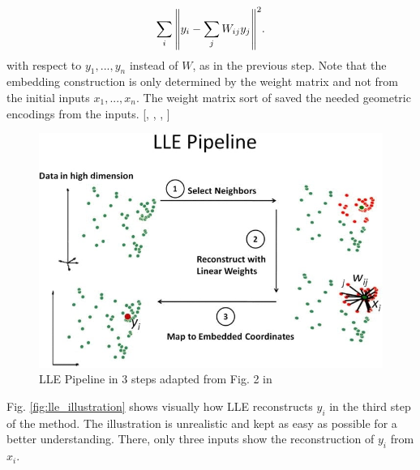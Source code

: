 \begin{equation}
    \sum_i \norm{y_i - \sum_{j} W_{ij}y_j}^2.
\end{equation}
with respect to $y_1,...,y_n$ instead of $W$, as in the previous step. Note that the embedding construction is only determined by the weight matrix and not from the initial inputs $x_1,...,x_n$. The weight matrix sort of saved the needed geometric encodings from the inputs. [\cite{saul03}, \cite{Cayton05}, \cite{Sarveniazi14}, \cite{Gisbrecht15}]
\begin{figure}[!]
	\centering
	\includegraphics[width=\columnwidth]{images/lle_pipeline.jpg}
	\caption[LLE Pipeline]{LLE Pipeline in 3 steps adapted from Fig. 2 in \cite{Akhbardeh12}}
    \label{fig:lle_pipeline}
\end{figure}
Fig. \ref{fig:lle_illustration} shows visually how LLE reconstructs $y_i$ in the third step of the method. The illustration is unrealistic and kept as easy as possible for a better understanding. There, only three inputs show the reconstruction of $y_i$ from $x_i$.
